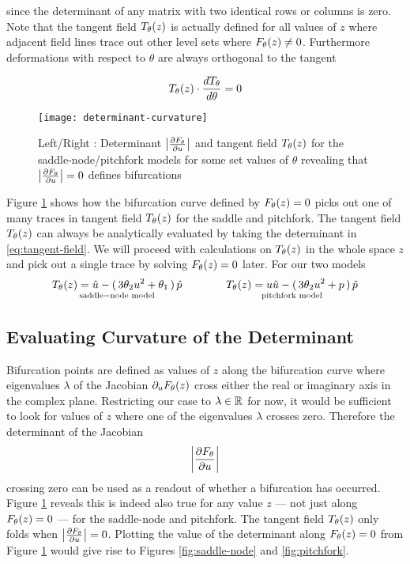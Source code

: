 since the determinant of any matrix with two identical rows or columns is zero. Note that the tangent field $T_{\theta}(z)$ is actually defined for all values of $z$ where adjacent field lines trace out other level sets where $F_{\theta}(z)\neq0$. Furthermore deformations with respect to $\theta$ are always orthogonal to the tangent

\begin{align}
    T_{\theta}(z)\cdot\frac{dT_{\theta}}{d\theta}=0
\end{align}

\begin{figure}
\centering
\texttt{[image: determinant-curvature]}
\caption{Left/Right : Determinant $\left| \frac{\partial F_{\theta}}{\partial u} \right|$ and tangent field $T_{\theta}(z)$ for the saddle-node/pitchfork models for some set values of $\theta$ revealing that $\left| \frac{\partial F_{\theta}}{\partial u} \right|=0$ defines bifurcations}
\label{fig:determinant-curvature}
\end{figure}

Figure \ref{fig:determinant-curvature} shows how the bifurcation curve defined by $F_{\theta}(z)=0$ picks out one of many traces in tangent field $T_{\theta}(z)$ for the saddle and pitchfork. The tangent field $T_{\theta}(z)$ can always be analytically evaluated by taking the determinant in \eqref{eq:tangent-field}. We will proceed with calculations on $T_{\theta}(z)$ in the whole space $z$ and pick out a single trace by solving $F_{\theta}(z)=0$ later. For our two models
\begin{align}
    \underset{\mathrm{saddle-node\,\,model}}{
    T_{\theta}(z)=\hat{u}-(\,3\theta_2 u^2+\theta_1\,)\,\hat{p}}
    \qquad\qquad
    \underset{\mathrm{pitchfork\,\,model}}{
    T_{\theta}(z)=u\hat{u}-(\,3\theta_2 u^2+p\,)\,\hat{p}}
    \label{eq:tangent-field-examples}
\end{align}

\subsection{Evaluating Curvature of the Determinant}
\label{section:curvature}

Bifurcation points are defined as values of $z$ along the bifurcation curve where eigenvalues $\lambda$ of the Jacobian $\partial_u F_{\theta}(z)$ cross either the real or imaginary axis in the complex plane. Restricting our case to $\lambda\in\mathbb{R}$ for now, it would be sufficient to look for values of $z$ where one of the eigenvalues $\lambda$ crosses zero. Therefore the determinant of the Jacobian
\begin{align}
    \left| \frac{\partial F_{\theta}}{\partial u} \right|
\end{align}
crossing zero can be used as a readout of whether a bifurcation has occurred. Figure \ref{fig:determinant-curvature} reveals this is indeed also true for any value $z$ --- not just along $F_{\theta}(z)=0$ --- for the saddle-node and pitchfork. The tangent field $T_{\theta}(z)$ only folds when $\left| \frac{\partial F_{\theta}}{\partial u} \right|=0$. Plotting the value of the determinant along $F_{\theta}(z)=0$ from Figure \ref{fig:determinant-curvature} would give rise to Figures \ref{fig:saddle-node} and \ref{fig:pitchfork}.

